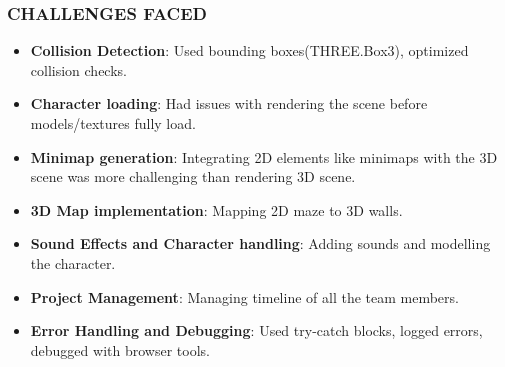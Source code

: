\documentclass[9pt]{beamer}
\begin{document}
\begin{frame}
    \frametitle{CHALLENGES FACED}
    \begin{itemize}
        \item \textbf{Collision Detection}: Used bounding boxes(THREE.Box3), optimized collision checks.
        \item \textbf{Character loading}: Had issues with rendering the scene before models/textures fully load.
        \item \textbf{Minimap generation}: Integrating 2D elements like minimaps with the 3D scene was more challenging than rendering 3D scene.
        \item \textbf{3D Map implementation}: Mapping 2D maze to 3D walls.
        \item \textbf{Sound Effects and Character handling}: Adding sounds and modelling the character.
        \item \textbf{Project Management}: Managing timeline of all the team members.
        \item \textbf{Error Handling and Debugging}: Used try-catch blocks, logged errors, debugged with browser tools.
    \end{itemize}
\end{frame}
\end{document}
